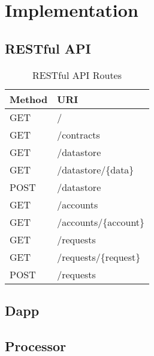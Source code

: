 \chapter{Implementation}
\label{implemenation}

\section{RESTful API}

\begin{table}[ht!]
\centering
\begin{tabular}{|l|l|}
\hline
 Method & URI  \\ \hline
 GET & /\  \\ \hline
 GET &  /contracts \\ \hline
 GET &  /datastore \\ \hline
 GET &  /datastore/\{data\} \\ \hline
 POST &  /datastore\\ \hline
 GET &  /accounts \\ \hline
 GET &  /accounts/\{account\} \\ \hline
 GET &  /requests \\ \hline
 GET &  /requests/\{request\} \\ \hline
 POST &  /requests \\ \hline
\end{tabular}
\caption{RESTful API Routes}
\label{table:api_routes}
\end{table}

\section{Dapp}
\section{Processor}

